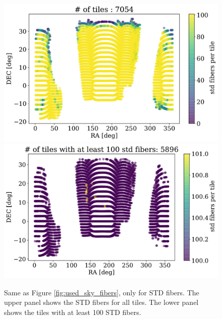 \documentclass{article}
\begin{document}
\begin{figure}[!h]
\begin{center}
\begin{center}
\includegraphics[scale=0.60]{assigned_std_ra_dec_all.pdf}
\includegraphics[scale=0.60]{assigned_std_ra_dec_above.pdf}
\end{center}
\caption{Same as Figure \ref{fig:used_sky_fibers}, only for STD fibers.
The upper panel shows the STD fibers for all tiles.
The lower panel shows the tiles with at least 100 STD fibers.
\label{fig:used_std_fibers}}
\end{center}
\end{figure}
\end{document}
